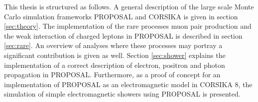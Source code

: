 This thesis is structured as follows.
A general description of the large scale Monte Carlo simulation frameworks PROPOSAL and CORSIKA is given in section \ref{sec:theory}.
The implementation of the rare processes muon pair production and the weak interaction of charged leptons in PROPOSAL is described in section \ref{sec:rare}.
An overview of analyses where these processes may portray a significant contribution is given as well.
Section \ref{sec:shower} explains the implementation of a correct description of electron, positron and photon propagation in PROPOSAL.
Furthermore, as a proof of concept for an implementation of PROPOSAL as an electromagnetic model in CORSIKA 8, the simulation of simple electromagnetic showers using PROPOSAL is presented.   
